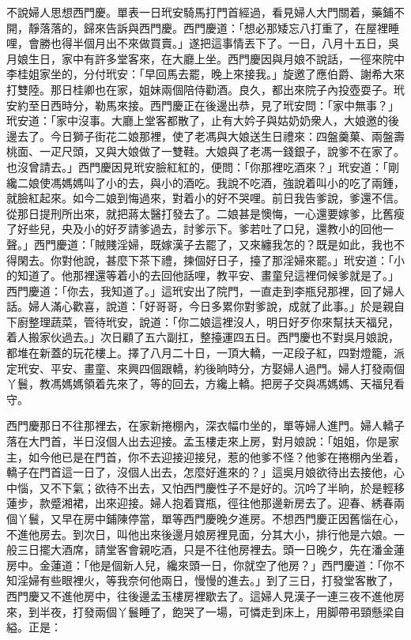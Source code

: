 不說婦人思想西門慶。單表一日玳安騎馬打門首經過，看見婦人大門關着，藥鋪不開，靜落落的，歸來告訴與西門慶。西門慶道：「想必那矮忘八打重了，在屋裡睡哩，會勝也得半個月出不來做買賣。」遂把這事情丟下了。一日，八月十五日，吳月娘生日，家中有許多堂客來，在大廳上坐。西門慶因與月娘不說話，一徑來院中李桂姐家坐的，分付玳安：「早回馬去罷，晚上來接我。」旋邀了應伯爵、謝希大來打雙陸。那日桂卿也在家，姐妹兩個陪侍勸酒。良久，都出來院子內投壺耍子。玳安約至日西時分，勒馬來接。西門慶正在後邊出恭，見了玳安問：「家中無事？」玳安道：「家中沒事。大廳上堂客都散了，止有大妗子與姑奶奶衆人，大娘邀的後邊去了。今日獅子街花二娘那裡，使了老馮與大娘送生日禮來：{}四盤羹菓、兩盤壽桃面、一疋尺頭，又與大娘做了一雙鞋。大娘與了老馮一錢銀子，說爹不在家了。也沒曾請去。」{}西門慶因見玳安臉紅紅的，便問：「你那裡吃酒來？」玳安道：「剛纔二娘使馮媽媽叫了小的去，與小的酒吃。我說不吃酒，強說着叫小的吃了兩鍾，就臉紅起來。{}如今二娘到悔過來，對着小的好不哭哩。前日我告爹說，爹還不信。從那日提刑所出來，就把蔣太醫打發去了。二娘甚是懊悔，一心還要嫁爹，比舊瘦了好些兒，央及小的好歹請爹過去，討爹示下。爹若吐了口兒，還教小的回他一聲。」西門慶道：「賊賤淫婦，既嫁漢子去罷了，又來纏我怎的？既是如此，我也不得閑去。你對他說，甚麼下茶下禮，揀個好日子，擡了那淫婦來罷。」{}玳安道：「小的知道了。他那裡還等着小的去回他話哩，教平安、畫童兒這裡伺候爹就是了。」西門慶道：「你去，我知道了。」這玳安出了院門，一直走到李瓶兒那裡，回了婦人話。婦人滿心歡喜，說道：「好哥哥，今日多累你對爹說，成就了此事。」於是親自下廚整理蔬菜，管待玳安，說道：「你二娘這裡沒人，明日好歹你來幫扶天福兒，着人搬家伙過去。」次日顧了五六副扛，整擡運四五日。西門慶也不對吳月娘說，都堆在新蓋的玩花樓上。擇了八月二十日，一頂大轎，一疋段子紅，四對燈籠，派定玳安、平安、畫童、來興四個跟轎，約後晌時分，方娶婦人過門。婦人打發兩個丫鬟，教馮媽媽領着先來了，等的回去，方纔上轎。把房子交與馮媽媽、天福兒看守。

西門慶那日不往那裡去，在家新捲棚內，深衣幅巾坐的，單等婦人進門。婦人轎子落在大門首，半日沒個人出去迎接。{}孟玉樓走來上房，對月娘說：「姐姐，你是家主，如今他已是在門首，你不去迎接迎接兒，惹的他爹不怪？他爹在捲棚內坐着，轎子在門首這一日了，沒個人出去，怎麼好進來的？」這吳月娘欲待出去接他，心中惱，又不下氣；欲待不出去，又怕西門慶性子不是好的。沉吟了半晌，於是輕移蓮步，款蹙湘裙，出來迎接。婦人抱着寶瓶，徑往他那邊新房去了。迎春、綉春兩個丫鬟，又早在房中鋪陳停當，單等西門慶晚夕進房。不想西門慶正因舊惱在心，不進他房去。到次日，叫他出來後邊月娘房裡見面，分其大小，排行他是六娘。一般三日擺大酒席，請堂客會親吃酒，只是不往他房裡去。頭一日晚夕，先在潘金蓮房中。金蓮道：「他是個新人兒，{}纔來頭一日，你就空了他房？」西門慶道：「你不知淫婦有些眼裡火，等我奈何他兩日，慢慢的進去。」到了三日，打發堂客散了，西門慶又不進他房中，往後邊孟玉樓房裡歇去了。這婦人見漢子一連三夜不進他房來，到半夜，打發兩個丫鬟睡了，飽哭了一場，可憐走到床上，用脚帶弔頸懸梁自縊。{}正是：

